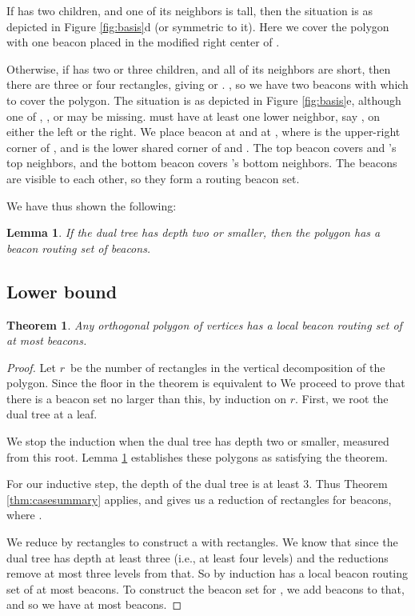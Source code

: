 \documentclass{article}
\newtheorem{thm}{Theorem}[section]
\newtheorem{lemma}{Lemma}
\begin{document}
		If  has two children, and one of its neighbors is tall, then
		the situation is as depicted in Figure \ref{fig:basis}d (or symmetric to it).
		Here we cover the polygon with one beacon placed in the modified
		right center of .
		
		Otherwise, if  has two or three children, and all of its neighbors are
		short, then there are three or four rectangles, giving  or .
		, so we have two beacons with which to
		cover the polygon.
		The situation is as depicted in Figure \ref{fig:basis}e, although one of
		, , or  may be missing.
		 must have at least one lower neighbor, say ,
		on either the left or the right.
		We place beacon  at  and 
		 at ,
		where  is the upper-right corner of , and 
		 is the lower shared corner of  and .
		The top beacon  covers  and 's top neighbors, and the bottom
		beacon  covers 's bottom neighbors.  The beacons are visible to each
		other, so they form a routing beacon set.
		
		We have thus shown the following:
		
		\begin{lemma}\label{lem:basis}
		If the dual tree has depth two or smaller, then the polygon has a beacon
		routing set of  beacons.
		\end{lemma}
		
	\subsection{Lower bound}
	
		\begin{thm}
			Any orthogonal polygon of  vertices has a local beacon routing set of at
			most  beacons.
		\end{thm}
		\newcommand{\nrect}{\ensuremath{r}}
		
		\begin{proof}
			Let \nrect\  be the number of rectangles in the vertical decomposition of the
			polygon.  Since  the floor in the theorem is equivalent to
			  We proceed to prove
			that there is a beacon set no larger than this, by induction on \nrect.
			First, we root the dual tree at a leaf.
			
			We stop the induction when the dual tree has depth two or smaller, measured
			from this root.
			Lemma \ref{lem:basis} establishes these polygons as satisfying the theorem.

			For our inductive step, the depth of the dual tree is at least 3.
			Thus Theorem \ref{thm:casesummary} applies, and gives us a reduction of
			 rectangles for  beacons, where .
			
			We reduce  by  rectangles to construct a
			 with  rectangles.
			We know that  since the dual tree has depth at least three
			(i.e., at least four levels)
			and the reductions remove at most three levels from that.
			So by induction  has a local beacon routing set of at most 
			 beacons.
			To construct the beacon set for , we add  beacons to that, 
			and so we have at most
			 beacons.
		\end{proof}	 
		 
\end{document}
